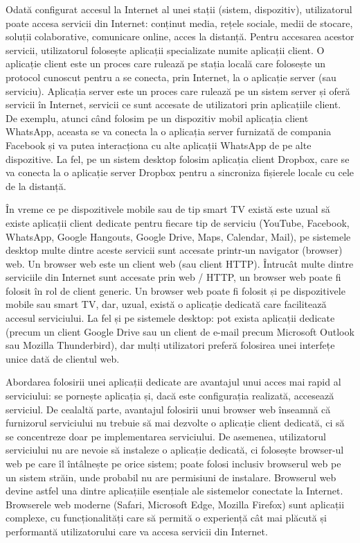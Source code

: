 Odată configurat accesul la Internet al unei stații (sistem, dispozitiv), utilizatorul poate accesa servicii din Internet: conținut media, rețele sociale, medii de stocare, soluții colaborative, comunicare online, acces la distanță.
Pentru accesarea acestor servicii, utilizatorul folosește aplicații specializate numite aplicații client.
O aplicație client este un proces care rulează pe stația locală care folosește un protocol cunoscut pentru a se conecta, prin Internet, la o aplicație server (sau serviciu).
Aplicația server este un proces care rulează pe un sistem server și oferă servicii în Internet, servicii ce sunt accesate de utilizatori prin aplicațiile client.
De exemplu, atunci când folosim pe un dispozitiv mobil aplicația client WhatsApp, aceasta se va conecta la o aplicația server furnizată de compania Facebook și va putea interacționa cu alte aplicații WhatsApp de pe alte dispozitive.
La fel, pe un sistem desktop folosim aplicația client Dropbox, care se va conecta la o aplicație server Dropbox pentru a sincroniza fișierele locale cu cele de la distanță.

În vreme ce pe dispozitivele mobile sau de tip smart TV există este uzual să existe aplicații client dedicate pentru fiecare tip de serviciu (YouTube, Facebook, WhatsApp, Google Hangouts, Google Drive, Maps, Calendar, Mail), pe sistemele desktop multe dintre aceste servicii sunt accesate printr-un navigator (browser) web.
Un browser web este un client web (sau client HTTP).
Întrucât multe dintre serviciile din Internet sunt accesate prin web / HTTP, un browser web poate fi folosit în rol de client generic.
Un browser web poate fi folosit și pe dispozitivele mobile sau smart TV, dar, uzual, există o aplicație dedicată care facilitează accesul serviciului.
La fel și pe sistemele desktop: pot exista aplicații dedicate (precum un client Google Drive sau un client de e-mail precum Microsoft Outlook sau Mozilla Thunderbird), dar mulți utilizatori preferă folosirea unei interfețe unice dată de clientul web.

Abordarea folosirii unei aplicații dedicate are avantajul unui acces mai rapid al serviciului: se pornește aplicația și, dacă este configurația realizată, accesează serviciul.
De cealaltă parte, avantajul folosirii unui browser web înseamnă că furnizorul serviciului nu trebuie să mai dezvolte o aplicație client dedicată, ci să se concentreze doar pe implementarea serviciului.
De asemenea, utilizatorul serviciului nu are nevoie să instaleze o aplicație dedicată, ci folosește browser-ul web pe care îl întâlnește pe orice sistem;
poate folosi inclusiv browserul web pe un sistem străin, unde probabil nu are permisiuni de instalare.
Browserul web devine astfel una dintre aplicațiile esențiale ale sistemelor conectate la Internet.
Browserele web moderne (Safari, Microsoft Edge, Mozilla Firefox) sunt aplicații complexe, cu funcționalități care să permită o experiență cât mai plăcută și performantă utilizatorului care va accesa servicii din Internet.

